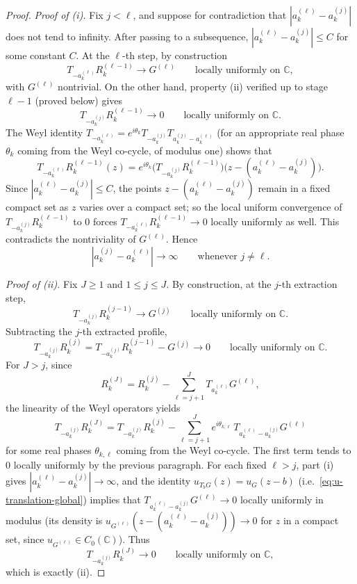 \documentclass[a4paper,11pt,reqno]{amsart}
\numberwithin{equation}{section}
\theoremstyle{plain} %
\theoremstyle{definition} %
\theoremstyle{remark}
\newcommand{\C}{\mathbb{C}}
\begin{document}
\begin{proof}
\medskip
\noindent\emph{Proof of (i).}
Fix \(j<\ell\), and suppose for contradiction that
\(|a_k^{(\ell)}-a_k^{(j)}|\) does not tend to infinity. After passing to a
subsequence, \(|a_k^{(\ell)}-a_k^{(j)}|\le C\) for some constant \(C\). At
the \(\ell\)-th step, by construction
\[
T_{-a_k^{(\ell)}}R_k^{(\ell-1)}\to G^{(\ell)}
\qquad\text{locally uniformly on }\C,
\]
with \(G^{(\ell)}\) nontrivial. On the other hand, property (ii) verified up
to stage \(\ell-1\) (proved below) gives
\[
T_{-a_k^{(j)}}R_k^{(\ell-1)}\to 0
\qquad\text{locally uniformly on }\C.
\]
The Weyl identity
\(T_{-a_k^{(\ell)}}=e^{i\theta_k}T_{-a_k^{(j)}}T_{a_k^{(j)}-a_k^{(\ell)}}\)
(for an appropriate real phase \(\theta_k\) coming from the Weyl co-cycle, of
modulus one) shows that
\[
T_{-a_k^{(\ell)}}R_k^{(\ell-1)}(z)
=
e^{i\theta_k}\big(T_{-a_k^{(j)}}R_k^{(\ell-1)}\big)\!
\big(z-(a_k^{(\ell)}-a_k^{(j)})\big).
\]
Since \(|a_k^{(\ell)}-a_k^{(j)}|\le C\), the points
\(z-(a_k^{(\ell)}-a_k^{(j)})\) remain in a fixed compact set as \(z\)
varies over a compact set; so the local uniform convergence of
\(T_{-a_k^{(j)}}R_k^{(\ell-1)}\) to \(0\) forces
\(T_{-a_k^{(\ell)}}R_k^{(\ell-1)}\to 0\) locally uniformly as well.
This contradicts the nontriviality of \(G^{(\ell)}\). Hence
\[
|a_k^{(j)}-a_k^{(\ell)}|\to\infty
\qquad\text{whenever }j\neq \ell.
\]

\medskip
\noindent\emph{Proof of (ii).}
Fix \(J\ge 1\) and \(1\le j\le J\). By construction, at the \(j\)-th
extraction step,
\[
T_{-a_k^{(j)}}R_k^{(j-1)}\to G^{(j)}
\qquad\text{locally uniformly on }\C.
\]
Subtracting the \(j\)-th extracted profile,
\[
T_{-a_k^{(j)}}R_k^{(j)}
=
T_{-a_k^{(j)}}R_k^{(j-1)}-G^{(j)}
\to 0
\qquad\text{locally uniformly on }\C.
\]
For \(J>j\), since
\[
R_k^{(J)}
=
R_k^{(j)}-\sum_{\ell=j+1}^J T_{a_k^{(\ell)}}G^{(\ell)},
\]
the linearity of the Weyl operators yields
\[
T_{-a_k^{(j)}}R_k^{(J)}
=
T_{-a_k^{(j)}}R_k^{(j)}
-\sum_{\ell=j+1}^J e^{i\theta_{k,\ell}}\,T_{a_k^{(\ell)}-a_k^{(j)}}G^{(\ell)}
\]
for some real phases \(\theta_{k,\ell}\) coming from the Weyl co-cycle. The
first term tends to \(0\) locally uniformly by the previous paragraph. For
each fixed \(\ell>j\), part (i) gives \(|a_k^{(\ell)}-a_k^{(j)}|\to\infty\),
and the identity \(u_{T_b G}(z)=u_G(z-b)\) (i.e.\
\eqref{eq:u-translation-global}) implies that
\(T_{a_k^{(\ell)}-a_k^{(j)}}G^{(\ell)}\to 0\) locally uniformly in modulus
(its density is \(u_{G^{(\ell)}}(z-(a_k^{(\ell)}-a_k^{(j)}))\to 0\) for
\(z\) in a compact set, since \(u_{G^{(\ell)}}\in C_0(\C)\)). Thus
\[
T_{-a_k^{(j)}}R_k^{(J)}\to 0
\qquad\text{locally uniformly on }\C,
\]
which is exactly (ii).


\end{proof}
\end{document}
